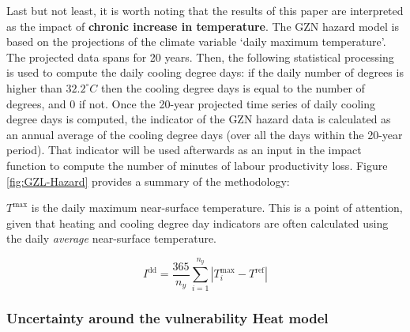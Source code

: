 \documentclass[a4paper,11pt]{extarticle} %
\begin{document}
Last but not least, it is worth noting that the results of this paper are interpreted as the impact of \textbf{chronic increase in temperature}.
The GZN hazard  model is based on the projections of the climate variable `daily maximum temperature'. The projected data spans for 20 years. Then, the following statistical processing is used to compute the daily cooling degree days: if the daily number of degrees is higher than $32.2^\circ C$ then the cooling degree days is equal to the number of degrees, and 0 if not. Once the 20-year projected time series of daily cooling degree days is computed, the indicator of the GZN hazard data is calculated as an annual average of the cooling degree days (over all the days within the 20-year period). That indicator will be used afterwards as an input in the impact function to compute the number of minutes of labour productivity loss. Figure \ref{fig:GZL-Hazard} provides a summary of the methodology:

$T^\text{max}$ is the daily maximum near-surface temperature. This is a point of attention, given that heating and cooling degree day indicators are often calculated using the daily \emph{average} near-surface temperature. 

\begin{equation}
	\label{Eq:degree_days}
	I^\text{dd} = \frac{365}{n_y} \sum_{i = 1}^{n_y} |  T^\text{max}_i - T^\text{ref} | 
\end{equation}



\subsubsection{Uncertainty around the vulnerability Heat model}
\end{document}
